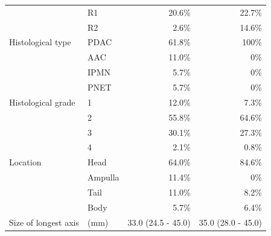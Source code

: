 \documentclass[dissertation.tex]{subfiles}
\begin{document}
\begin{table}[h]
\begin{tabular}{@{}llrr@{}}
                           & R1                       & 20.6\%                   & 22.7\%                                                 \\
                           & R2                       & 2.6\%                    & 14.6\%                                                 \\
Histological type          & \gls{PDAC}             & 61.8\%                   & 100\%                                                  \\
                           & AAC & 11.0\%                   & 0\%                                                    \\
                           & IPMN                     & 5.7\%                    & 0\%                                                    \\
                           & PNET                     & 5.7\%                    & 0\%                                                    \\
Histological grade         & 1                        & 12.0\%                   & 7.3\%                                                  \\
                           & 2                        & 55.8\%                   & 64.6\%                                                 \\
                           & 3                        & 30.1\%                   & 27.3\%                                                 \\
                           & 4                        & 2.1\%                    & 0.8\%                                                  \\
Location                   & Head                     & 64.0\%                   & 84.6\%                                                 \\
                           & Ampulla                  & 11.4\%                   & 0\%                                                    \\
                           & Tail                     & 11.0\%                   & 8.2\%                                                  \\
                           & Body                     & 5.7\%                    & 6.4\%                                                  \\
Size of longest axis                & (mm)                     & 33.0 (24.5 - 45.0)       & 35.0 (28.0 - 45.0)                                     \\

\end{tabular}
\end{table}
\end{document}
